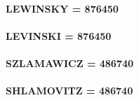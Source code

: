 \documentclass[12pt,a4paper]{article}
\begin{document}
	\paragraph{LEWINSKY = 876450\\}
	
	\paragraph{LEVINSKI = 876450\\}
	
	\paragraph{SZLAMAWICZ = 486740\\}
	
	\paragraph{SHLAMOVITZ = 486740\\}
	
\end{document}
